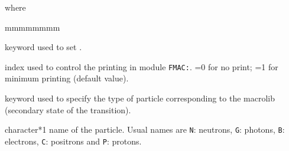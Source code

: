 \noindent where
\begin{ListeDeDescription}{mmmmmmmm}

\item[\moc{EDIT}] keyword used to set .

\item[\dusa{iprint}] index used to control the printing in module {\tt FMAC:}. =0 for no print; =1 for minimum printing (default value).

\item[\moc{PARTICLE}] keyword used to specify the type of particle corresponding to the {\sc macrolib} (secondary state of the transition).

\item[\dusa{htype}] character*1 name of the particle. Usual names are {\tt N}: neutrons, {\tt G}: photons, {\tt B}: electrons,
{\tt C}: positrons and {\tt P}: protons.

\end{ListeDeDescription}

\eject
